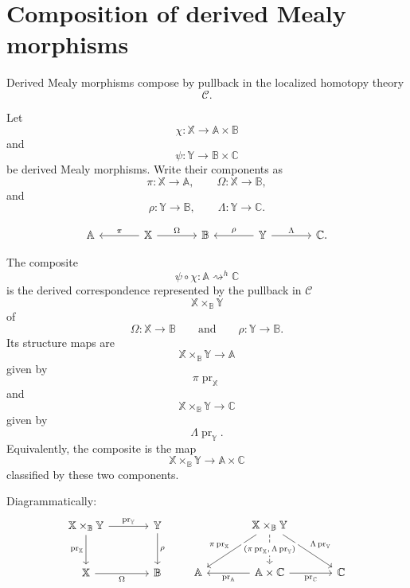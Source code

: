 \section{Composition of derived Mealy morphisms}
\label{sec:composition-derived-mealy-rewritten}

Derived Mealy morphisms compose by pullback in the localized homotopy
theory
\[
\mathcal C.
\]

Let
\[
\chi:\mathbb X\to\mathbb A\times\mathbb B
\]
and
\[
\psi:\mathbb Y\to\mathbb B\times\mathbb C
\]
be derived Mealy morphisms. Write their components as
\[
\pi:\mathbb X\to\mathbb A,
\qquad
\Omega:\mathbb X\to\mathbb B,
\]
and
\[
\rho:\mathbb Y\to\mathbb B,
\qquad
\Lambda:\mathbb Y\to\mathbb C.
\]

\[
\begin{tikzcd}[column sep=large]
\mathbb A
&
\mathbb X
\arrow[l, "\pi"']
\arrow[r, "\Omega"]
&
\mathbb B
&
\mathbb Y
\arrow[l, "\rho"']
\arrow[r, "\Lambda"]
&
\mathbb C.
\end{tikzcd}
\]

\begin{definition}
\label{def:composite-derived-mealy-rewritten}
The composite
\[
\psi\circ\chi:\mathbb A\rightsquigarrow^h\mathbb C
\]
is the derived correspondence represented by the pullback in
\(\mathcal C\)
\[
\mathbb X\times_{\mathbb B}\mathbb Y
\]
of
\[
\Omega:\mathbb X\to\mathbb B
\qquad
\text{and}
\qquad
\rho:\mathbb Y\to\mathbb B.
\]
Its structure maps are
\[
\mathbb X\times_{\mathbb B}\mathbb Y
\longrightarrow
\mathbb A
\]
given by
\[
\pi\operatorname{pr}_{\mathbb X}
\]
and
\[
\mathbb X\times_{\mathbb B}\mathbb Y
\longrightarrow
\mathbb C
\]
given by
\[
\Lambda\operatorname{pr}_{\mathbb Y}.
\]
Equivalently, the composite is the map
\[
\mathbb X\times_{\mathbb B}\mathbb Y
\longrightarrow
\mathbb A\times\mathbb C
\]
classified by these two components.
\end{definition}

Diagrammatically:
\[
\begin{tikzcd}[column sep=large, row sep=large]
\mathbb X\times_{\mathbb B}\mathbb Y
\arrow[r, "\operatorname{pr}_{\mathbb Y}"]
\arrow[d, "\operatorname{pr}_{\mathbb X}"']
&
\mathbb Y
\arrow[d, "\rho"]
\\
\mathbb X
\arrow[r, "\Omega"']
&
\mathbb B
\end{tikzcd}
\qquad
\begin{tikzcd}[column sep=large, row sep=large]
&
\mathbb X\times_{\mathbb B}\mathbb Y
\arrow[dl, "\pi\operatorname{pr}_{\mathbb X}"']
\arrow[dr, "\Lambda\operatorname{pr}_{\mathbb Y}"]
\arrow[d, dashed, "{(\pi\operatorname{pr}_{\mathbb X},\,\Lambda\operatorname{pr}_{\mathbb Y})}" description]
&
\\
\mathbb A
&
\mathbb A\times\mathbb C
\arrow[l, "\operatorname{pr}_{\mathbb A}"]
\arrow[r, "\operatorname{pr}_{\mathbb C}"']
&
\mathbb C
\end{tikzcd}
\]

